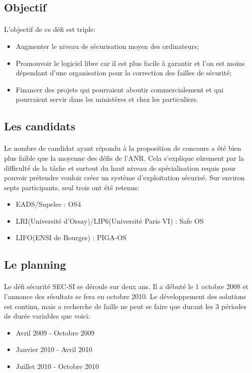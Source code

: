 		\subsection{Objectif}
			\paragraph*{}
				L'objectif de ce défi est triple:
				\begin{itemize}
   					\item Augmenter le niveau de sécurisation moyen des ordinateurs;
   					\item Promouvoir le logiciel libre car il est plus facile à garantir et l'on est moins dépendant d'une organisation pour la correction des failles de sécurité;
   					\item Financer des projets qui pourraient aboutir commercialement et qui pourraient servir dans les ministères et chez les particuliers.
   				\end{itemize}
			
			
		\subsection{Les candidats}
			\paragraph*{}
				Le nombre de candidat ayant répondu à la proposition de concours a été bien plus faible que la moyenne des défis de l'ANR. Cela s'explique sûrement par la difficulté de la tâche et surtout du haut niveau de spécialisation requis pour pouvoir prétendre vouloir créer un système d'exploitation sécurisé.\newline
				Sur environ septs participants, seul trois ont été retenus:
				\begin{itemize}
   					\item EADS/Supelec : OS4
   					\item LRI(Université d'Orsay)/LIP6(Université Paris VI) : Safe OS
   					\item LIFO(ENSI de Bourges) : PIGA-OS
   				\end{itemize}
   			
   		\subsection{Le planning}
   			\paragraph*{}
   				Le défi sécurité SEC-SI se déroule sur deux ans. Il a débuté le 1 octobre 2008 et l'annonce des résultats se fera en octobre 2010. Le développement des solutions est continu, mais a recherche de faille ne peut se faire que durant les 3 périodes de durée variables que voici:
   				\begin{itemize}
   					\item Avril 2009 - Octobre 2009
   					\item Janvier 2010 - Avril 2010
   					\item Juillet 2010 - Octobre 2010
   				\end{itemize}
   			
